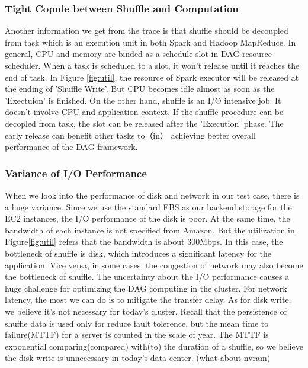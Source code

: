 \subsubsection{Tight Copule between Shuffle and Computation}
Another information we get from the trace is that shuffle should be decoupled from task which is an execution unit in both Spark and Hadoop MapReduce. In general, CPU and memory are binded as a schedule slot in DAG resource scheduler. When a task is scheduled to a slot, it won't release until it reaches the end of task. In Figure \ref{fig:util}, the resource of Spark executor will be released at the ending of 'Shuffle Write'.
But CPU becomes idle almost as soon as the 'Exectuion' is finished. On the other hand, shuffle is an I/O intensive job. It doesn't involve CPU and application context. If the shuffle procedure can be decopled from task, the slot can be released after the 'Execution' phase. The early release can benefit other tasks to（in） achieving better overall performance of the DAG framework.

\subsubsection{Variance of I/O Performance}
When we look into the performance of disk and network in our test case, there is a huge variance. Since we use the standard EBS as our backend storage for the EC2 instances, the I/O performance of the disk is poor. 
At the same time, the bandwidth of each instance is not specified from Amazon. But the utilization in Figure\ref{fig:util} refers that the bandwidth is about 300Mbps. In this case, the bottleneck of shuffle is disk, which introduces a significant latency for the application. Vice versa, in some cases, the congestion of network may also become the bottleneck of shuffle\cite{varys}. The uncertainty about the I/O performance causes a huge challenge for optimizing the DAG computing in the cluster. For network latency, the most we can do is to mitigate the transfer delay. As for disk write, we believe it's not necessary for today's cluster. Recall that the persistence of shuffle data is used only for reduce fault tolerence, but the mean time to failure(MTTF) for a server is counted in the scale of year\cite{tachyon}. The MTTF is exponential comparing(compared) with(to) the duration of a shuffle, so we believe the disk write is unnecessary in today's data center. (what about nvram)

